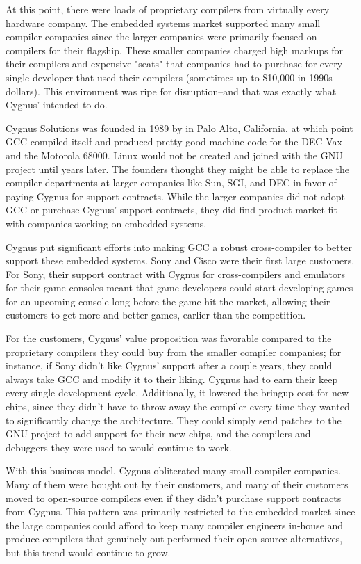 At this point, there were loads of proprietary compilers from virtually
every hardware company.
The embedded systems market supported many small compiler companies
since the larger companies were primarily focused on compilers for
their flagship.
These smaller companies charged high markups for their compilers
and expensive "seats" that companies had to purchase for every single
developer that used their compilers (sometimes up to \$10,000 in 1990s dollars).
This environment was ripe for disruption--and that was exactly what Cygnus'
intended to do.

Cygnus Solutions was founded in 1989 by
\citeauthor{gilmore_tiemann_henkel_wallace_cygnus_history_2006}
in Palo Alto, California,
at which point GCC compiled itself and produced pretty good machine code
for the DEC Vax and the Motorola 68000.
Linux would not be created and joined with the GNU project until years later.
The founders thought they might be able to replace the compiler departments
at larger companies like Sun, SGI, and DEC in favor of paying Cygnus
for support contracts.
While the larger companies did not adopt GCC or purchase Cygnus' support contracts,
they did find product-market fit with companies working on embedded systems.

Cygnus put significant efforts into making GCC a robust cross-compiler
to better support these embedded systems.
Sony and Cisco were their first large customers.
For Sony, their support contract with Cygnus for cross-compilers and emulators
for their game consoles meant that game developers could start developing games
for an upcoming console long before the game hit the market, allowing their
customers to get more and better games, earlier than the competition.

For the customers, Cygnus' value proposition was favorable compared to the
proprietary compilers they could buy from the smaller compiler companies;
for instance, if Sony didn't like Cygnus' support after a couple years, they could
always take GCC and modify it to their liking. Cygnus had to earn their
keep every single development cycle.
Additionally, it lowered the bringup cost for new chips, since they didn't have to
throw away the compiler every time they wanted to significantly change the architecture.
They could simply send patches to the GNU project to add support for their new chips,
and the compilers and debuggers they were used to would continue to work.

With this business model, Cygnus obliterated many small compiler companies.
Many of them were bought out by their customers, and many of their customers
moved to open-source compilers even if they didn't purchase support contracts
from Cygnus.
This pattern was primarily restricted to the embedded market since the large companies
could afford to keep many compiler engineers in-house and produce compilers that
genuinely out-performed their open source alternatives, but this trend would
continue to grow.


